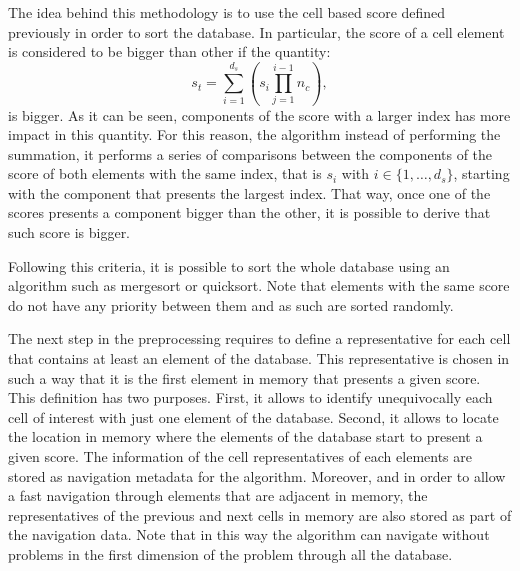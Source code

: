 \documentclass[preprint,12pt]{elsarticle}
\begin{document}
The idea behind this methodology is to use the cell based score defined previously in order to sort the database. In particular, the score of a cell element is considered to be bigger than other if the quantity:
\begin{equation}
s_t = \sum_{i = 1}^{d_s} \left(s_i\prod_{j = 1}^{i - 1}n_c\right), 
\end{equation}
is bigger. As it can be seen, components of the score with a larger index has more impact in this quantity. For this reason, the algorithm instead of performing the summation, it performs a series of comparisons between the components of the score of both elements with the same index, that is $s_i$ with $i\in \{1,\dots,d_s\}$, starting with the component that presents the largest index. That way, once one of the scores presents a component bigger than the other, it is possible to derive that such score is bigger.

Following this criteria, it is possible to sort the whole database using an algorithm such as mergesort or quicksort. Note that elements with the same score do not have any priority between them and as such are sorted randomly.

The next step in the preprocessing requires to define a representative for each cell that contains at least an element of the database. This representative is chosen in such a way that it is the first element in memory that presents a given score. This definition has two purposes. First, it allows to identify unequivocally each cell of interest with just one element of the database. Second, it allows to locate the location in memory where the elements of the database start to present a given score. The information of the cell representatives of each elements are stored as navigation metadata for the algorithm. Moreover, and in order to allow a fast navigation through elements that are adjacent in memory, the representatives of the previous and next cells in memory are also stored as part of the navigation data. Note that in this way the algorithm can navigate without problems in the first dimension of the problem through all the database.
\end{document}
